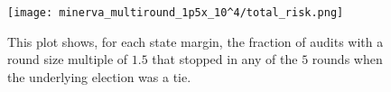 


\begin{figure}
\texttt{[image: minerva\_multiround\_1p5x\_10^4/total\_risk.png]}
\caption{This plot shows, for each state margin,
the fraction of \Minerva audits with a round size multiple of $1.5$ that stopped in any of the $5$ rounds when the underlying election was a tie.}
\label{fig:minerva1p5_risk}
\end{figure}




